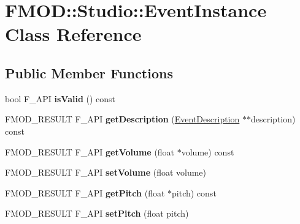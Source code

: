 \hypertarget{class_f_m_o_d_1_1_studio_1_1_event_instance}{\section{F\+M\+O\+D\+:\+:Studio\+:\+:Event\+Instance Class Reference}
\label{class_f_m_o_d_1_1_studio_1_1_event_instance}
}
\subsection*{Public Member Functions}
\begin{DoxyCompactItemize}
\item 
\hypertarget{class_f_m_o_d_1_1_studio_1_1_event_instance_a74aa3fc1877fa3d0c88bdf2913326811}{bool F\+\_\+\+A\+P\+I {\bfseries is\+Valid} () const }\label{class_f_m_o_d_1_1_studio_1_1_event_instance_a74aa3fc1877fa3d0c88bdf2913326811}

\item 
\hypertarget{class_f_m_o_d_1_1_studio_1_1_event_instance_a0dd4629dbf049565009f4932c6110f3a}{F\+M\+O\+D\+\_\+\+R\+E\+S\+U\+L\+T F\+\_\+\+A\+P\+I {\bfseries get\+Description} (\hyperlink{class_f_m_o_d_1_1_studio_1_1_event_description}{Event\+Description} $\ast$$\ast$description) const }\label{class_f_m_o_d_1_1_studio_1_1_event_instance_a0dd4629dbf049565009f4932c6110f3a}

\item 
\hypertarget{class_f_m_o_d_1_1_studio_1_1_event_instance_a12876c3f0379b18c434218aa504efe32}{F\+M\+O\+D\+\_\+\+R\+E\+S\+U\+L\+T F\+\_\+\+A\+P\+I {\bfseries get\+Volume} (float $\ast$volume) const }\label{class_f_m_o_d_1_1_studio_1_1_event_instance_a12876c3f0379b18c434218aa504efe32}

\item 
\hypertarget{class_f_m_o_d_1_1_studio_1_1_event_instance_af4c5ace0dce477110e154df958b27e21}{F\+M\+O\+D\+\_\+\+R\+E\+S\+U\+L\+T F\+\_\+\+A\+P\+I {\bfseries set\+Volume} (float volume)}\label{class_f_m_o_d_1_1_studio_1_1_event_instance_af4c5ace0dce477110e154df958b27e21}

\item 
\hypertarget{class_f_m_o_d_1_1_studio_1_1_event_instance_a3e74ea0004f54744ad382e274b712463}{F\+M\+O\+D\+\_\+\+R\+E\+S\+U\+L\+T F\+\_\+\+A\+P\+I {\bfseries get\+Pitch} (float $\ast$pitch) const }\label{class_f_m_o_d_1_1_studio_1_1_event_instance_a3e74ea0004f54744ad382e274b712463}

\item 
\hypertarget{class_f_m_o_d_1_1_studio_1_1_event_instance_ae03be8fea8e6318a62830cd0171ae2da}{F\+M\+O\+D\+\_\+\+R\+E\+S\+U\+L\+T F\+\_\+\+A\+P\+I {\bfseries set\+Pitch} (float pitch)}\label{class_f_m_o_d_1_1_studio_1_1_event_instance_ae03be8fea8e6318a62830cd0171ae2da}


\end{DoxyCompactItemize}
